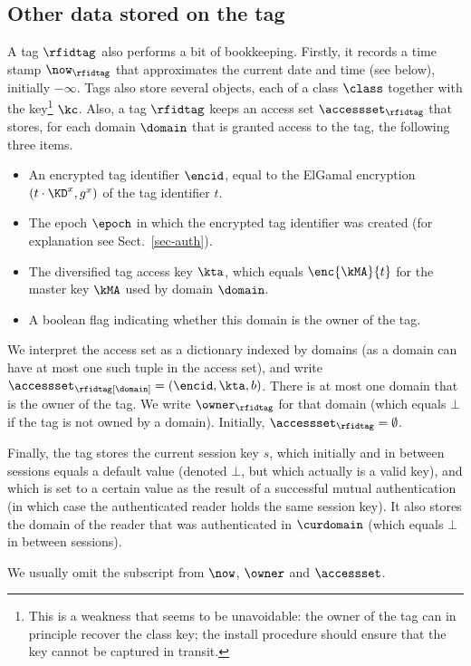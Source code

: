 \subsection{Other data stored on the tag}

A tag $\rfidtag$ also performs a bit of bookkeeping. Firstly, it records
a time stamp $\now_\rfidtag$ that approximates the current date and time (see
below), initially $-\infty$.  
Tags also store several objects, each of a class $\class$ together
with the key\footnote{This is a weakness that seems to be unavoidable: the owner of
	the tag can in principle recover the class key; the install
	procedure should ensure that the key cannot be captured in transit.
}
$\kc$. 
Also, a tag $\rfidtag$ keeps an access set $\accessset_\rfidtag$ that
stores, for each domain $\domain$ that is granted access to the tag, the
following three items.
\begin{itemize}
\fixlistspacing
\item An encrypted tag identifier $\encid$, equal to the ElGamal encryption
$(t \cdot \KD^x,g^x)$ of the tag identifier $t$.
\item The epoch $\epoch$ in which the encrypted tag identifier was created
  (for explanation see Sect.~\ref{sec-auth}).
\item The diversified tag access key $\kta$, which equals $\enc{\kMA}{t}$ 
for the master key $\kMA$ used by domain $\domain$. 
\item A boolean flag indicating whether this domain is the owner of the tag.
\end{itemize}
We interpret the access set as a dictionary indexed by domains
(as a domain can have at most one such tuple in the access set), and
write $\accessset_\rfidtag[\domain] = (\encid,\kta,b)$.
There is at most one domain that is the owner of the tag. We write
$\owner_\rfidtag$ for that domain (which equals $\bot$ if the tag is not owned
by a domain). 
Initially, $\accessset_\rfidtag = \emptyset$.

Finally, the tag stores the current session key $s$, which initially and
in between sessions equals a default value (denoted $\bot$, but which actually
is a valid key), and which is set to a
certain value as the result of a successful mutual authentication (in which case
the authenticated reader holds the same session key). It also stores the
domain of the reader that was authenticated in $\curdomain$ (which equals
$\bot$ in between sessions).

We usually omit the subscript from $\now$, $\owner$ and
$\accessset$. 



